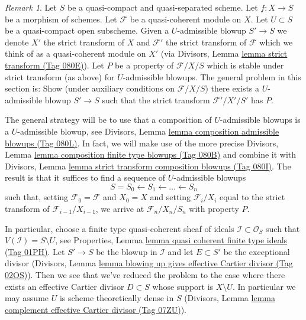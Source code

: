\documentclass{amsart}
\theoremstyle{plain}
\theoremstyle{definition}
\theoremstyle{remark}
\newtheorem{remark}[subsection]{Remark}
\numberwithin{equation}{subsection}
\begin{document}
\begin{remark}
\label{remark-successive-blowups}
Let $S$ be a quasi-compact and quasi-separated scheme. Let $f : X \to S$
be a morphism of schemes. Let $\mathcal{F}$ be a quasi-coherent module on $X$.
Let $U \subset S$ be a quasi-compact open subscheme. Given a $U$-admissible
blowup $S' \to S$ we denote $X'$ the strict transform of $X$ and $\mathcal{F}'$
the strict transform of $\mathcal{F}$ which we think of as a quasi-coherent
module on $X'$ (via Divisors, Lemma \href{https://stacks.math.columbia.edu/tag/080E}{lemma strict transform (Tag 080E)}).
Let $P$ be a property of $\mathcal{F}/X/S$ which is stable under strict
transform (as above) for $U$-admissible blowups. The general problem in
this section is: Show (under auxiliary conditions on $\mathcal{F}/X/S$)
there exists a $U$-admissible blowup $S' \to S$
such that the strict transform $\mathcal{F}'/X'/S'$ has $P$.

\medskip\noindent
The general strategy will be to use that a composition of
$U$-admissible blowups is a $U$-admissible blowup, see
Divisors, Lemma \href{https://stacks.math.columbia.edu/tag/080L}{lemma composition admissible blowups (Tag 080L)}.
In fact, we will make use of the more precise
Divisors, Lemma \href{https://stacks.math.columbia.edu/tag/080B}{lemma composition finite type blowups (Tag 080B)}
and combine it with
Divisors, Lemma \href{https://stacks.math.columbia.edu/tag/080I}{lemma strict transform composition blowups (Tag 080I)}.
The result is that it suffices to find a sequence of $U$-admissible
blowups
$$
S = S_0 \leftarrow S_1 \leftarrow \ldots \leftarrow S_n
$$
such that, setting $\mathcal{F}_0 = \mathcal{F}$ and $X_0 = X$ and setting
$\mathcal{F}_i/X_i$ equal to the strict transform of
$\mathcal{F}_{i - 1}/X_{i - 1}$, we
arrive at $\mathcal{F}_n/X_n/S_n$ with property $P$.

\medskip\noindent
In particular, choose a finite type quasi-coherent sheaf of ideals
$\mathcal{I} \subset \mathcal{O}_S$ such that $V(\mathcal{I}) = S \setminus U$,
see Properties, Lemma \href{https://stacks.math.columbia.edu/tag/01PH}{lemma quasi coherent finite type ideals (Tag 01PH)}.
Let $S' \to S$ be the blowup in $\mathcal{I}$ and let $E \subset S'$
be the exceptional divisor (Divisors, Lemma
\href{https://stacks.math.columbia.edu/tag/02OS}{lemma blowing up gives effective Cartier divisor (Tag 02OS)}).
Then we see that we've reduced the
problem to the case where there exists an effective Cartier divisor
$D \subset S$ whose support is $X \setminus U$. In particular we may
assume $U$ is scheme theoretically dense in $S$
(Divisors, Lemma \href{https://stacks.math.columbia.edu/tag/07ZU}{lemma complement effective Cartier divisor (Tag 07ZU)}).


\end{remark}
\end{document}
